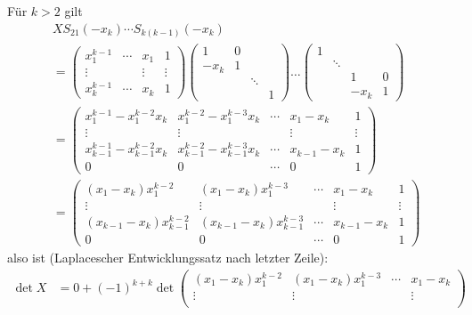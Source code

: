 \begin{Definition}
		Für $ k>2 $ gilt
			\begin{align*}
			&XS_{21}(-x_k)\cdots S_{k(k-1)}(-x_k) \\
			&= 
			\begin{pmatrix}
				x_1^{k-1} &\cdots & x_1 & 1\\
				\vdots & & \vdots & \vdots\\
				x_k^{k-1} & \cdots & x_k & 1
			\end{pmatrix}\begin{pmatrix}
				1 & 0 &   & \\
				-x_k & 1 &  & \\
				 &  & \ddots & \\
				 & & & 1
			\end{pmatrix}
			\dots
			\begin{pmatrix}
			1 &  &   & \\
			  & \ddots&  &\\
			   &   &1 & 0 \\
			    & & -x_k & 1			
			\end{pmatrix}\\
			&= \begin{pmatrix}
			x_1^{k-1}-x_1^{k-2}x_k & x_1^{k-2}-x_1^{k-3}x_k & \cdots & x_1-x_k & 1 \\ 
			\vdots & \vdots &  & \vdots & \vdots \\ 
			x_{k-1}^{k-1}-x_{k-1}^{k-2}x_k & x_{k-1}^{k-2}-x_{k-1}^{k-3}x_k & \cdots & x_{k-1}-x_k & 1 \\ 
			0 & 0 & \cdots & 0 & 1
			\end{pmatrix}\\ 
			&= \begin{pmatrix}
			(x_1-x_k)x_1^{k-2} & (x_1-x_k)x_1^{k-3} & \cdots & x_1-x_k & 1 \\ 
			\vdots & \vdots &  & \vdots & \vdots \\ 
			(x_{k-1}-x_k)x_{k-1}^{k-2}& (x_{k-1}-x_k)x_{k-1}^{k-3} & \cdots & x_{k-1}-x_k & 1 \\ 
			0 & 0 & \cdots & 0 & 1
			\end{pmatrix}
			\end{align*}
		also ist (Laplacescher Entwicklungssatz nach letzter Zeile):
			\begin{align*}
                        \det X &= 0+(-1)^{k+k}\det 
				\begin{pmatrix}
					(x_1-x_k)x_1^{k-2} & (x_1-x_k)x_1^{k-3} & \cdots & x_1-x_k \\ 
					\vdots & \vdots &  & \vdots  \\ 

\end{pmatrix}
\end{align*}
\end{Definition}
